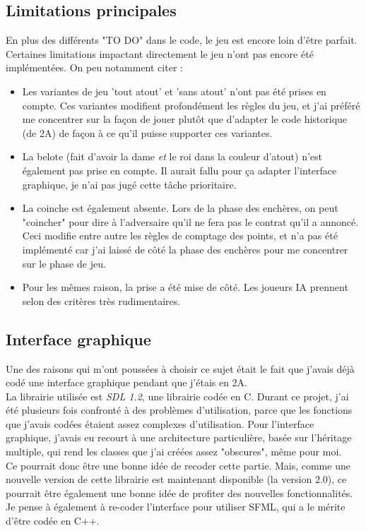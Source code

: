 \documentclass[a4paper,11pt]{article}
\begin{document}
\subsection{Limitations principales}

En plus des différents "TO DO" dans le code, le jeu est encore loin d'être parfait. Certaines limitations impactant directement le jeu n'ont pas encore été implémentées. On peu notamment citer :
\begin{itemize}
\item Les variantes de jeu 'tout atout' et 'sans atout' n'ont pas été prises en compte. Ces variantes modifient profondément les règles du jeu, et j'ai préféré me concentrer sur la façon de jouer plutôt que d'adapter le code historique (de 2A) de façon à ce qu'il puisse supporter ces variantes.
\item La belote (fait d'avoir la dame \textit{et} le roi dans la couleur d'atout) n'est également pas prise en compte. Il aurait fallu pour ça adapter l'interface graphique, je n'ai pas jugé cette tâche prioritaire.
\item La coinche est également absente. Lors de la phase des enchères, on peut "coincher" pour dire à l'adversaire qu'il ne fera pas le contrat qu'il a annoncé. Ceci modifie entre autre les règles de comptage des points, et n'a pas été implémenté car j'ai laissé de côté la phase des enchères pour me concentrer sur le phase de jeu.
\item Pour les mêmes raison, la prise a été mise de côté. Les joueurs IA prennent selon des critères très rudimentaires.
\end{itemize}

\subsection{Interface graphique}

Une des raisons qui m'ont poussées à choisir ce sujet était le fait que j'avais déjà codé une interface graphique pendant que j'étais en 2A.\\
La librairie utilisée est \textit{SDL 1.2}, une librairie codée en C. Durant ce projet, j'ai été plusieurs fois confronté à des problèmes d'utilisation, parce que les fonctions que j'avais codées étaient assez complexes d'utilisation. Pour l'interface graphique,  j'avais eu recourt à une architecture particulière, basée sur l'héritage multiple, qui rend les classes que j'ai créées assez "obscures", même pour moi. \\
Ce pourrait donc être une bonne idée de recoder cette partie. Mais, comme une nouvelle version de cette librairie est maintenant disponible (la version 2.0), ce pourrait être également une bonne idée de profiter des nouvelles fonctionnalités. Je pense à également à re-coder l'interface pour utiliser SFML, qui a le mérite d'être codée en C++.\\
\end{document}
